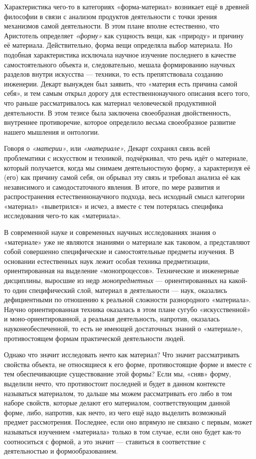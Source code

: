\documentclass[11pt,a4paper]{article}
\begin{document}
Характеристика чего-то в категориях «форма-материал» возникает ещё в древней
философии в связи с анализом продуктов деятельности с точки зрения механизмов
самой деятельности. В этом плане вполне естественно, что Аристотель определяет
\emph{«форму»} как сущность вещи, как «природу» и причину её материала.
Действительно, форма вещи определяла выбор материала. Но подобная
характеристика исключала научное изучение последнего в качестве
самостоятельного объекта и, следовательно, мешала формированию научных
разделов внутри искусства — техники, то есть препятствовала созданию
инженерии.  Декарт вынужден был заявить, что «материя есть причина самой
себя», и тем самым открыл дорогу для естественнонаучного описания всего того,
что раньше рассматривалось как материал человеческой продуктивной
деятельности. В этом тезисе была заключена своеобразная двойственность,
внутреннее противоречие, которое определило весьма своеобразное развитие
нашего мышления и онтологии.

Говоря о \emph{«материи»}, или \emph{«материале»}, Декарт сохранял связь всей
проблематики с искусством и техникой, подчёркивал, что речь идёт о материале,
который получается, когда мы снимаем деятельностную форму, а характеризуя её
(его) как причину самой себя, он обрывал эту связь и требовал анализа её как
независимого и самодостаточного явления. В итоге, по мере развития и
распространения естественнонаучного подхода, весь исходный смысл категории
«материал» «выветрился» и исчез, а вместе с тем потерялась специфика
исследования чего-то как «материала».

В современной науке и современных научных исследованиях знания о «материале»
уже не являются знаниями о материале как таковом, а представляют собой
совершенно специфические и самостоятельные предметы изучения. В основании
естественных наук лежит особая техника предметизации, ориентированная на
выделение «монопроцессов». Технические и инженерные дисциплины, выросшие из
недр \emph{монопредметных} — ориентированных на какой-то один специфический
слой, материал в деятельности — наук, оказались дефициентными по отношению к
реальной сложности разнородного «материала». Научно ориентированная техника
оказалась в этом плане сугубо «искусственной» и моно-ориентированной, а
реальная деятельность, напротив, оказалась науконеобеспеченной, то есть не
имеющей достаточных знаний о «материале», противостоящем формам практической
деятельности людей.

Однако что значит исследовать нечто как материал? Что значит рассматривать
свойства объекта, не относящиеся к его форме, противостоящие форме и вместе с
тем обеспечивающие существование этой формы? Если мы, «сняв» форму, выделили
нечто, что противостоит последней и будет в данном контексте называться
материалом, то дальше мы можем рассматривать его либо в том наборе свойств,
которые делают его материалом, соответствующим данной форме, либо, напротив,
как нечто, из чего ещё надо выделить возможный предмет рассмотрения.
Последнее, если оно впрямую не связано с первым, может называться изучением
«материала» только в том случае, если оно будет как-то соотноситься с формой,
а это значит — ставиться в соответствие с деятельностью и формообразованием.
\end{document}
